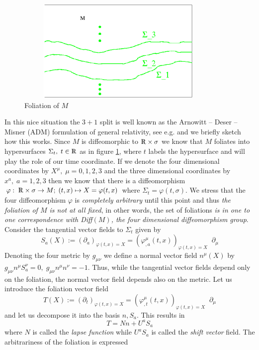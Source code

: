 \documentclass[12pt]{report}
\def\be{\begin{equation}}
\def\ee{\end{equation}}
\def\Rl{{\mathchoice
{\setbox0=\hbox{$\displaystyle\rm R$}\hbox{\hbox to0pt
{\kern0.4\wd0\vrule height0.9\ht0\hss}\box0}}
{\setbox0=\hbox{$\textstyle\rm R$}\hbox{\hbox to0pt
{\kern0.4\wd0\vrule height0.9\ht0\hss}\box0}}
{\setbox0=\hbox{$\scriptstyle\rm R$}\hbox{\hbox to0pt
{\kern0.4\wd0\vrule height0.9\ht0\hss}\box0}}
{\setbox0=\hbox{$\scriptscriptstyle\rm R$}\hbox{\hbox to0pt
{\kern0.4\wd0\vrule height0.9\ht0\hss}\box0}}}}
\begin{document}
\begin{figure} 
\includegraphics[width=10cm,height=5cm]{proc9fig5.ps}
\caption{Foliation of $M$} 
\label{f5}
\end{figure}
%
In this nice situation the $3+1$ split is well known as the 
Arnowitt -- Deser -- Misner (ADM) formulation of general relativity,
see e.g. \cite{2} and we briefly sketch how this works. Since $M$ is 
diffeomorphic to $\Rl\times \sigma$
we know that $M$ foliates into hypersurfaces $\Sigma_t,\;t\in\Rl$ as in
figure \ref{f5}, where $t$ labels the hypersurface and will play the role 
of our time coordinate. If we denote 
the four dimensional coordinates by $X^\mu,\; \mu=0,1,2,3$ and the three 
dimensional coordinates by $x^a,\; a=1,2,3$ then we know that there 
is a diffeomorphism $\varphi:\;\Rl\times \sigma\to M;\; (t,x)\mapsto
X=\varphi(t,x)$ where $\Sigma_t=\varphi(t,\sigma)$. We stress that the 
four diffeomorphism $\varphi$ is {\it completely arbitrary} 
until this point and thus {\it the foliation of $M$ is not at all fixed},
in other words, the set of foliations {\it is in one to one 
correspondence with Diff$(M)$, the four dimensional diffeomorphism group}. 
Consider the 
tangential vector fields to $\Sigma_t$ given by 
\be \label{1.2.1}
S_a(X):=(\partial_a)_{\varphi(t,x)=X}=
(\varphi^\mu_{,a}(t,x))_{\varphi(t,x)=X}\;\;\partial_\mu
\ee
Denoting the four metric by $g_{\mu\nu}$ we define a normal vector field 
$n^\mu(X)$ by $g_{\mu\nu} n^\mu S_a^\nu=0,\;g_{\mu\nu} n^\mu n^\nu=-1$.
Thus, while the tangential vector fields depend only on the foliation, 
the normal vector field depends also on the metric. Let us introduce the 
foliation vector field
\be \label{1.2.1a}
T(X):=(\partial_t)_{\varphi(t,x)=X}=
(\varphi^\mu_{,t}(t,x))_{\varphi(t,x)=X}\;\;\partial_\mu
\ee
and let us decompose it into the basis $n,S_a$. This results in 
\be \label{1.2.2}
T=Nn+U^a S_a
\ee
where $N$ is called the {\it lapse function} while $U^a S_a$ is called the 
{\it shift vector} field. The arbitrariness of the foliation is expressed 
\end{document}
